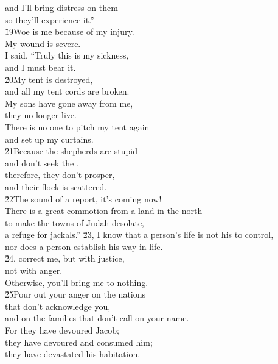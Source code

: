 \begin{poetry}
\poeml and I'll bring distress on them \\
\poemll    so they'll experience it.'' \\
\poeml \v{19}Woe is me because of my injury. \\
\poemll    My wound is severe. \\
\poeml I said, ``Truly this is my sickness, \\
\poemll    and I must bear it. \\
\poeml \v{20}My tent is destroyed, \\
\poemll    and all my tent cords are broken. \\
\poeml My sons have gone away from me, \\
\poemll    they no longer live. \\
\poeml There is no one to pitch my tent again \\
\poemll    and set up my curtains. \\
\poeml \v{21}Because the shepherds are stupid \\
\poemll    and don't seek the , \\
\poeml therefore, they don't prosper, \\
\poemll    and their flock is scattered. \\
\poeml \v{22}The sound of a report, it's coming now! \\
\poemll    There is a great commotion from a land in the north \\
\poeml to make the towns of Judah desolate, \\
\poemll    a refuge for jackals.''
\poeml \v{23}, I know that a person's life is not his to control, \\
\poemll    nor does a person establish his way in life. \\
\poeml \v{24}, correct me, but with justice, \\
\poemll    not with anger. \\
\poemlll       Otherwise, you'll bring me to nothing. \\
\poeml \v{25}Pour out your anger on the nations \\
\poemll    that don't acknowledge you, \\
\poemlll       and on the families that don't call on your name. \\
\poeml For they have devoured Jacob; \\
\poemll    they have devoured and consumed him; \\
\poemlll       they have devastated his habitation.
\end{poetry}


